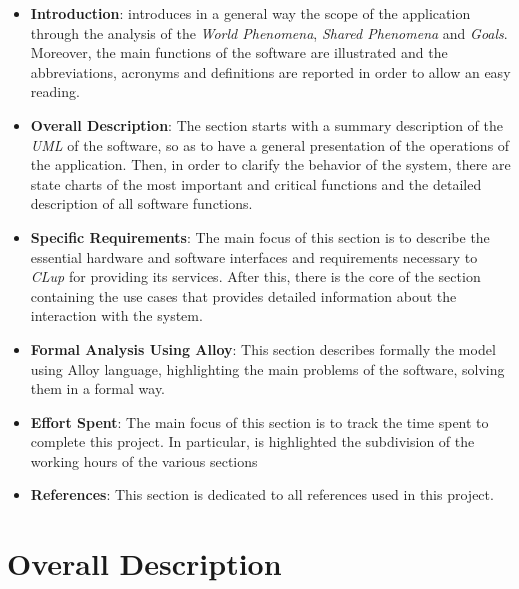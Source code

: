 \documentclass{article}
\begin{document}
	\begin{itemize}
		
		\item {\bfseries Introduction}: introduces in a general way the scope of the application through the analysis of the \emph{World Phenomena}, \emph{Shared Phenomena} and \emph{Goals}. Moreover, the main functions of the software are illustrated and the abbreviations, acronyms and definitions are reported in order to allow an easy reading.
		
		\item {\bfseries Overall Description}: The section starts with a summary description of the \emph{UML} of the software, so as to have a general presentation of the operations of the application. Then, in order to clarify the behavior of the system, there are state charts of the most important and critical functions and the detailed description of all software functions. 
		
		\item {\bfseries Specific Requirements}: The main focus of this section is to describe the essential hardware and software interfaces and requirements necessary to \emph{CLup} for providing its services. After this, there is the core of the section containing the use cases that provides detailed information about the interaction with the system.
		
		\item {\bfseries Formal Analysis Using Alloy}: This section describes formally the model using Alloy language, highlighting the main problems of the software, solving them in a formal way.
		
		\item {\bfseries Effort Spent}: The main focus of this section is to track the time spent to complete this project. In particular, is highlighted the subdivision of the working hours of the various sections
		
		\item {\bfseries References}: This section is dedicated to all references used in this project.
		
	\end{itemize}
	
\newpage	

\section{Overall Description}
\end{document}
